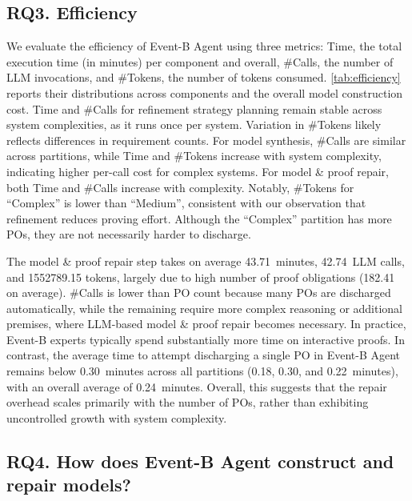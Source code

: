 \subsection{RQ3. Efficiency}



\noindent
We evaluate the efficiency of Event-B Agent using three metrics: Time, the total execution time (in minutes) per component and overall, \#Calls, the number of LLM invocations, and \#Tokens, the number of tokens consumed.
\autoref{tab:efficiency} reports their distributions across components and the overall model construction cost.
Time and \#Calls for refinement strategy planning remain stable across system complexities, as it runs once per system.
Variation in \#Tokens likely reflects differences in requirement counts.
For model synthesis, \#Calls are similar across partitions, while Time and \#Tokens increase with system complexity, indicating higher per-call cost for complex systems.
For model \& proof repair, both Time and \#Calls increase with complexity.
Notably, \#Tokens for ``Complex'' is lower than ``Medium'', consistent with our observation that refinement reduces proving effort.
Although the “Complex” partition has more POs, they are not necessarily harder to discharge.

The model \& proof repair step takes on average \SI{43.71}{minutes}, \SI{42.74}{LLM} calls, and 1552789.15 tokens, largely due to high number of proof obligations (182.41 on average).
\#Calls is lower than PO count because many POs are discharged automatically, while the remaining require more complex reasoning or additional premises, where LLM-based model \& proof repair becomes necessary.
In practice, Event-B experts typically spend substantially more time on interactive proofs.
In contrast, the average time to attempt discharging a single PO in Event-B Agent remains below \SI{0.30}{minutes} across all partitions (0.18, 0.30, and \SI{0.22}{minutes}), with an overall average of \SI{0.24}{minutes}.
Overall, this suggests that the repair overhead scales primarily with the number of POs, rather than exhibiting uncontrolled growth with system complexity.


\subsection{RQ4. How does Event-B Agent construct and repair models?}

